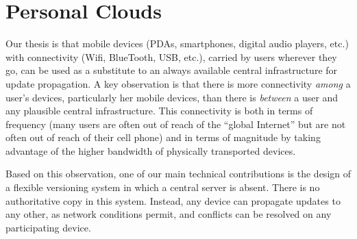


\section{Personal Clouds}
\label{sec:model}

Our thesis is that mobile devices (PDAs, smartphones, digital audio
players, etc.) with connectivity (Wifi, BlueTooth, USB, etc.), carried
by users wherever they go, can be used as a substitute to an always
available central infrastructure for update propagation. A key
observation is that there is more connectivity \emph{among} a user's
devices, particularly her mobile devices, than there is \emph{between} a
user and any plausible central infrastructure. This connectivity is both
in terms of frequency (many users are often out of reach of the ``global
Internet'' but are not often out of reach of their cell phone) and in
terms of magnitude by taking advantage of the higher bandwidth of
physically transported devices.

Based on this observation, one of our main technical contributions is the design of a
flexible versioning system in which a central server is absent.
There is no authoritative copy in this system. 
Instead, any device can propagate updates to any other, as network
conditions permit, and conflicts can be resolved on any participating 
device. 

